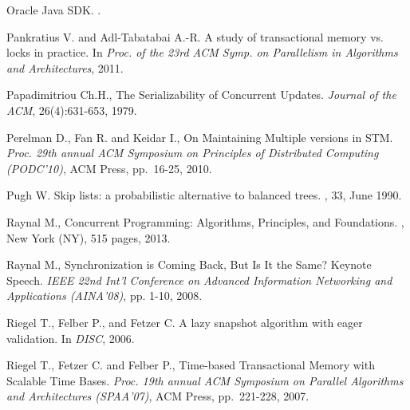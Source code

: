 \begin{thebibliography}{99}
{
Oracle Java SDK.
.



Pankratius V. and Adl-Tabatabai A.-R.
\newblock A study of transactional memory vs. locks in practice.
\newblock In {\em Proc. of the 23rd ACM Symp. on Parallelism in Algorithms and
  Architectures}, 2011.



Papadimitriou Ch.H., 
The Serializability of Concurrent Updates. 
{\it Journal of the ACM},  26(4):631-653, 1979. 





Perelman D., Fan R. and Keidar I., 
On Maintaining Multiple versions in STM. 
{\em  Proc.   29th  annual  ACM    Symposium  on Principles  of Distributed
Computing (PODC'10)}, ACM Press, pp.~16-25, 2010. 



Pugh W.
\newblock Skip lists: a probabilistic alternative to balanced trees.
, 33, June 1990.




Raynal  M.,
\newblock Concurrent Programming: Algorithms, Principles, and Foundations.
, New York (NY), 515 pages, 2013.

Raynal  M.,
Synchronization is Coming Back, But Is It the Same?
Keynote Speech. {\it  IEEE 22nd Int'l Conference on Advanced 
Information  Networking and Applications (AINA'08)},  pp. 1-10, 2008. 




Riegel T., Felber P., and Fetzer C.
\newblock A lazy snapshot algorithm with eager validation.
\newblock In {\em DISC}, 2006.


Riegel T., Fetzer C. and Felber P.,
Time-based Transactional Memory with Scalable Time Bases.
{\em  Proc.   19th  annual  ACM   Symposium  on  Parallel   Algorithms  and
Architectures (SPAA'07)}, ACM Press, pp.~221-228, 2007.

}
\end{thebibliography}
